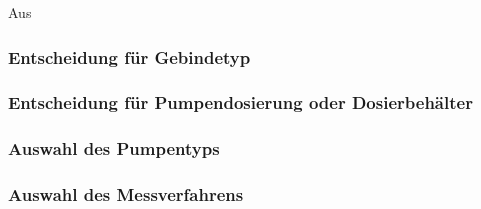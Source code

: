 
Aus 

\subsubsection{Entscheidung für Gebindetyp}

\subsubsection{Entscheidung für Pumpendosierung oder Dosierbehälter}

\subsubsection{Auswahl des Pumpentyps}


\subsubsection{Auswahl des Messverfahrens}

